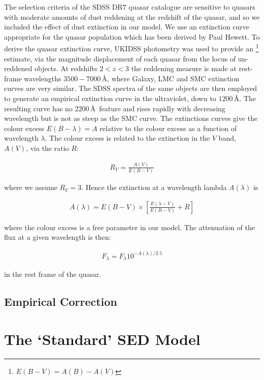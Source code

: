 The selection criteria of the SDSS DR$7$ quasar catalogue are sensitive to quasars with moderate amounts of dust reddening at the redshift of the quasar, and so we included the effect of dust extinction in our model. 
We use an extinction curve appropriate for the quasar population which has been derived by Paul Hewett. 
To derive the quasar extinction curve, UKIDSS photometry was used to provide an \ebv\footnote{$E(B-V)=A(B)-A(V)$} estimate, via the magnitude displacement of each quasar from the locus of un-reddened objects. 
At redshifts $2 < z < 3$ the reddening measure is made at rest-frame wavelengths $3500-7000$\,\AA, where Galaxy, LMC and SMC extinction curves are very similar. 
The SDSS spectra of the same objects are then employed to generate an empirical extinction curve in the ultraviolet, down to $1200$\,\AA. 
The resulting curve has no $2200$\,\AA\, feature and rises rapidly with decreasing wavelength but is not as steep as the SMC curve. 
The extinctions curves give the colour excess $E(B-\lambda) = A$ relative to the colour excess \ebv as a function of wavelength $\lambda$. 
The colour excess \ebv is related to the extinction in the $V$ band, $A(V)$, via the ratio $R$: 

\begin{eqnarray}
  R_V = \frac{A(V)}{E(B-V)}
\end{eqnarray}

where we assume $R_V = 3$. 
Hence the extinction at a wavelength lambda $A(\lambda)$ is 

\begin{eqnarray}
  A(\lambda) = E(B-V) \times \left[ \frac{E(\lambda-V)}{E(B-V)} + R \right] 
\end{eqnarray}

where the colour excess \ebv is a free parameter in our model. 
The attenuation of the flux at a given wavelength is then:

\begin{eqnarray}
  F_\lambda = F_\lambda10^{-A(\lambda)/2.5}
\end{eqnarray}

in the rest frame of the quasar. 

\subsection{Empirical Correction}


\section{The `Standard' SED Model} 

